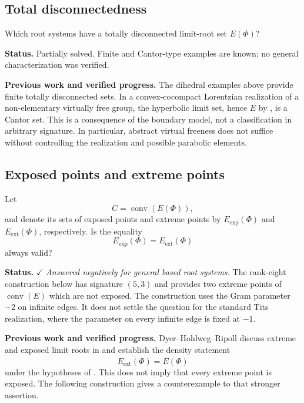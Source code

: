 \documentclass[11pt,reqno]{amsart}
\theoremstyle{plain}
\theoremstyle{definition}
\theoremstyle{remark}
\numberwithin{equation}{section}
\begin{document}
\subsection{Total disconnectedness}
Which root systems have a totally disconnected limit-root set $E(\Phi)$?


\par\medskip
\noindent\textbf{Status.} Partially solved. Finite and Cantor-type examples are known; no general characterization was verified.

\par\medskip
\noindent\textbf{Previous work and verified progress.}
The dihedral examples above provide finite totally disconnected
sets. In a convex-cocompact Lorentzian realization of a non-elementary
virtually free group, the hyperbolic limit set, hence $E$ by
\cite{HPR2020}, is a Cantor set. This is a consequence of the boundary
model, not a classification in arbitrary signature. In particular,
abstract virtual freeness does not suffice without controlling the
realization and possible parabolic elements.

\subsection{Exposed points and extreme points}

Let
\[
C=\operatorname{conv}(E(\Phi)),
\]
and denote its sets of exposed points and extreme points by
$E_{\mathrm{exp}}(\Phi)$ and $E_{\mathrm{ext}}(\Phi)$,
respectively.
Is the equality
\[
E_{\mathrm{exp}}(\Phi)=E_{\mathrm{ext}}(\Phi)
\]
always valid?

\par\medskip
\noindent\textbf{Status.}
\(\checkmark\) \textit{Answered negatively for general based root systems.}
The rank-eight construction below has signature $(5,3)$ and
provides two extreme points of $\operatorname{conv}(E)$
which are not exposed.
The construction uses the Gram parameter $-2$ on infinite edges.
It does not settle the question for the standard Tits realization,
where the parameter on every infinite edge is fixed at $-1$.

\par\medskip
\noindent\textbf{Previous work and verified progress.}
Dyer--Hohlweg--Ripoll discuss extreme and exposed limit roots in
\cite[Section~3.3]{DHR} and establish the density statement
\[
\overline{E_{\mathrm{ext}}(\Phi)}=E(\Phi)
\]
under the hypotheses of \cite[Theorem~3.4]{DHR}.
This does not imply that every extreme point is exposed.
The following construction gives a counterexample to that
stronger assertion.
\end{document}
